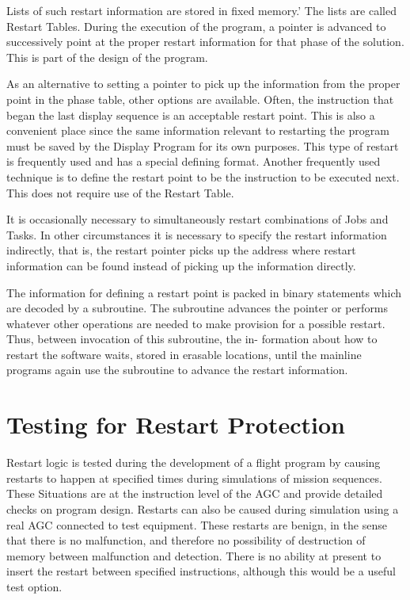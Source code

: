 \documentclass[oxford]{ahsan}
\begin{document}
Lists of such restart information are stored in fixed memory.’ The lists are called
Restart Tables. During the execution of the program, a pointer is advanced to
successively point at the proper restart information for that phase of the solution.
This is part of the design of the program.

As an alternative to setting a pointer to pick up the information from the proper point
in the phase table, other options are available. Often, the instruction that began the
last display sequence is an acceptable restart point. This is also a convenient place
since the same information relevant to restarting the program must be saved by the
Display Program for its own purposes. This type of restart is frequently used and has a
special defining format. Another frequently used technique is to define the restart
point to be the instruction to be executed next. This does not require use of the
Restart Table.

It is occasionally necessary to simultaneously restart combinations of Jobs and Tasks.
In other circumstances it is necessary to specify the restart information indirectly,
that is, the restart pointer picks up the address where restart information can be
found instead of picking up the information directly.

The information for defining a restart point is packed in binary statements which are
decoded by a subroutine. The subroutine advances the pointer or performs whatever other
operations are needed to make provision for a possible restart. Thus, between
invocation of this subroutine, the in- formation about how to restart the software
waits, stored in erasable locations, until the mainline programs again use the
subroutine to advance the restart information.

\section{Testing for Restart Protection}

Restart logic is tested during the development of a flight program by causing restarts
to happen at specified times during simulations of mission sequences. These Situations
are at the instruction level of the AGC and provide detailed checks on program design.
Restarts can also be caused during simulation using a real AGC connected to test
equipment. These restarts are benign, in the sense that there is no malfunction, and
therefore no possibility of destruction of memory between malfunction and detection.
There is no ability at present to insert the restart between specified instructions,
although this would be a useful test option.
\end{document}
